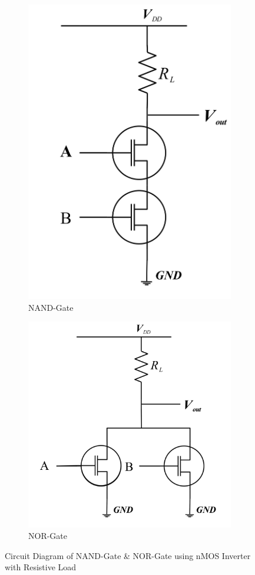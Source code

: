 \documentclass[a4paper,12pt]{article}
\begin{document}
		\begin{figure}[H]
			\centering
			
			\begin{subfigure}[t]{0.49\textwidth}
				\centering
				\includegraphics[width=.7\linewidth]{../EXP04_EEE2214/Images/mos/6}
				
				\caption{NAND-Gate}
				
				\label{fig:ci1}
			\end{subfigure}
			\hfill
			\begin{subfigure}[t]{0.49\textwidth}
				\centering
				\includegraphics[width=1\linewidth]{../EXP04_EEE2214/Images/mos/5}
				\caption{NOR-Gate}
				\label{fig:ci1}
			\end{subfigure}
			\caption{Circuit Diagram of NAND-Gate \& NOR-Gate using nMOS Inverter with Resistive Load}
		\end{figure}
	\newpage
\end{document}
